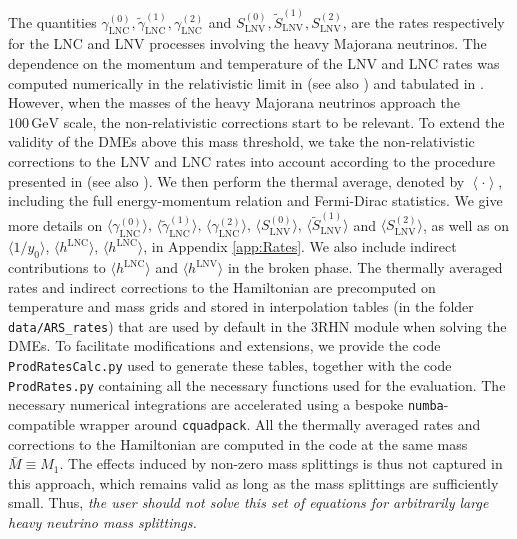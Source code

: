 \documentclass[12pt, a4paper]{article}
\def\Mav{\bar{M}}
\def\LNC{\text{LNC}}
\def\LNV{\text{LNV}}
\newcommand\AG[1]{{\color{orange} [{AG: \bf #1}]}}
\newcommand\DP[1]{{\color{blue} [{DP: \bf #1}]}}
\begin{document}
The quantities $\gamma_{\LNC}^{(0)}, \tilde{\gamma}_{\LNC}^{(1)}, \gamma_{\LNC}^{(2)}$ and $S_{\LNV}^{(0)}, \tilde{S}_{\LNV}^{(1)}, S_{\LNV}^{(2)}$, are the rates respectively for the LNC and LNV processes involving the heavy Majorana neutrinos. The dependence on the momentum and temperature of the LNV and LNC rates was computed numerically in the relativistic limit in \cite{Ghiglieri:2017csp} (see also \cite{Ghiglieri:2017gjz}) and tabulated in \href{http://www.laine.itp.unibe.ch/leptogenesis/}{}. However, when the masses of the heavy Majorana neutrinos approach the $100\,\text{GeV}$ scale, the non-relativistic corrections start to be relevant. To extend the validity of the DMEs above this mass threshold, we take the non-relativistic corrections to the LNV and LNC rates into account according to the procedure presented in \cite{Klaric:2021cpi} (see also \cite{Klaric:2020phc, Drewes:2021nqr}). We then perform the thermal average, denoted by $\left\langle \cdot \right \rangle$, including the full energy-momentum relation and Fermi-Dirac statistics. We give more details on $\langle\gamma_{\LNC}^{(0)}\rangle,\, \langle\tilde\gamma_{\LNC}^{(1)}\rangle,\,\langle\gamma_{\LNC}^{(2)}\rangle,\,\langle S_{\LNV}^{(0)}\rangle,\, \langle \tilde{S}_{\LNV}^{(1)}\rangle$ and $\langle S_{\LNV}^{(2)}\rangle$, as well as on $\langle 1/y_0\rangle$, $\langle h^{\LNC}\rangle$, $\langle h^{\LNC}\rangle$, in Appendix \ref{app:Rates}. We also include indirect contributions to $\langle h^{\LNC}\rangle$ and $\langle h^{\LNV} \rangle$ in the broken phase. 
The thermally averaged rates and indirect corrections to the Hamiltonian are precomputed on temperature and mass grids and stored in interpolation tables (in the folder \texttt{data/ARS\_rates}) that are used by default in the 3RHN module when solving the DMEs. To facilitate modifications and extensions, we provide the code \texttt{ProdRatesCalc.py} used to generate these tables, together with the code \texttt{ProdRates.py} containing all the necessary functions used for the evaluation. The necessary numerical integrations are accelerated using a bespoke \texttt{numba}-compatible wrapper around \texttt{cquadpack}. {All the thermally averaged rates and corrections to the Hamiltonian are computed in the code at the same mass $\Mav \equiv M_1$. The effects induced by non-zero mass splittings is thus not captured in this approach, which remains valid as long as the mass splittings are sufficiently small. Thus, \emph{the user should not solve this set of equations for arbitrarily large heavy neutrino mass splittings.}} 
\end{document}
